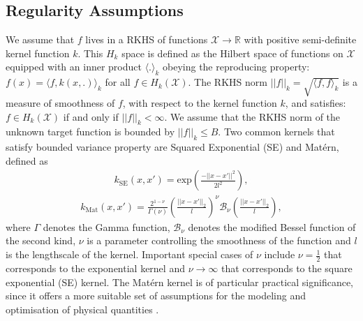 \documentclass[twoside]{article}
\begin{document}
\subsection{Regularity Assumptions}
We assume that $f$ lives in a RKHS of functions $\mathcal X \rightarrow \mathbb{R}$ with positive semi-definite kernel function $k$. This $H_k$ space is defined as the Hilbert space of functions on $\mathcal X$ equipped with an inner product $\langle .\rangle_k$  obeying the reproducing property: $f(x) = \langle f, k(x,.) \rangle_k$ for all $f \in H_k(\mathcal X)$. The RKHS norm $||f||_k = \sqrt{\langle f, f \rangle_k}$ is a measure of smoothness of $f$, with respect to the kernel function $k$, and satisfies: $f \in H_k(\mathcal X)$ if and only if $||f||_k < \infty$. We assume that the RKHS norm of the unknown target function is bounded by $||f||_k \le B$. Two common kernels that satisfy
bounded variance property are Squared Exponential (SE) and Mat\'ern, defined as
\begin{eqnarray}
k_{\text{SE}}(x, x') = \text{exp}(\frac{-||x-x'||^2}{2l^2}),
\label{eq_kernel}
\end{eqnarray}
\begin{eqnarray}
k_{\text{Mat}}(x, x') = \frac{2^{1-\nu}}{\Gamma(\nu)}(\frac{||x -x'||_2}{l})^{\nu}\mathcal B_{\nu}(\frac{||x- x'||_2}{l}),
\label{eq_kernel}
\end{eqnarray}
where $\Gamma$ denotes the Gamma function, $\mathcal{B}_{\nu}$ denotes the modified Bessel function of the second kind, $\nu$ is a parameter controlling the smoothness of the function and $l$ is the lengthscale of the kernel. Important special cases of $\nu$ include $\nu = \frac{1}{2}$ that corresponds to the exponential kernel and $\nu \rightarrow \infty$ that corresponds to the square exponential (SE) kernel. The Mat\'ern kernel is of particular practical significance, since it offers a more suitable set of assumptions for the modeling and optimisation of physical quantities \citep{stein1999}.
\end{document}
